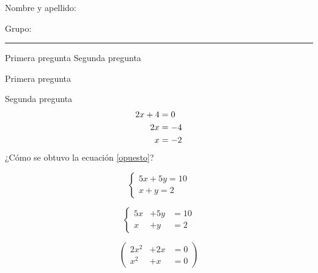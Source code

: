 \documentclass[a4paper,12pt]{exam}
\begin{document}
Nombre y apellido:\hrulefill

Grupo:\rule{2cm}{0.1mm}
\vspace{0.5cm}
\begin{questions}
\question Primera pregunta
\question Segunda pregunta
\end{questions}

\begin{questions}
 
\question Primera pregunta
 
\question Segunda pregunta
	\begin{align}
		2x+4 & =0 \notag \\
		2x & =-4 \label{opuesto}\\
		x & =-2
	\end{align}
	¿Cómo se obtuvo la ecuación \ref{opuesto}?
	
\end{questions}

\[
\left \{
\begin{array}{l}
5x+5y=10\\
x+y=2
\end{array}
\right .
\]

\[
\left \{
\begin{array}{rcl}
5x & +5y & =10\\
x & +y & =2
\end{array}
\right .
\]

\[
\left(
\begin{array}{rcl}
2x^2 & +2x & =0\\
x^2 & +x & =0
\end{array}
\right)
\]
\end{document}
